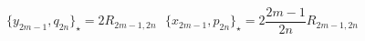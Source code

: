 \begin{equation}\{y_{2m-1},q_{2n}\}_\star=2 R_{2m-1,2n}\ \ \
\{x_{2m-1},p_{2n}\}_\star=2\frac{2m-1}{2n}R_{2m-1,2n}
\label{eq:mixed_ghost} \end{equation} 
